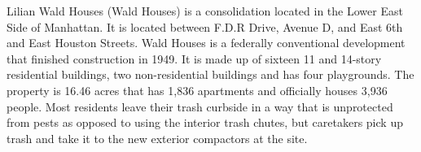  

Lilian Wald  Houses (Wald Houses) is a consolidation located in the Lower East Side of Manhattan. It is located between F.D.R Drive, Avenue D, and East 6th and East Houston Streets. Wald Houses is a federally conventional development that finished construction in 1949. It is made up of sixteen 11 and 14-story residential buildings, two non-residential buildings and has four playgrounds. The property is 16.46 acres that has 1,836 apartments and officially houses 3,936 people. Most residents leave their trash curbside in a way that is unprotected from pests as opposed to using the interior trash chutes, but caretakers pick up trash and take it to the new exterior compactors at the site.  

 